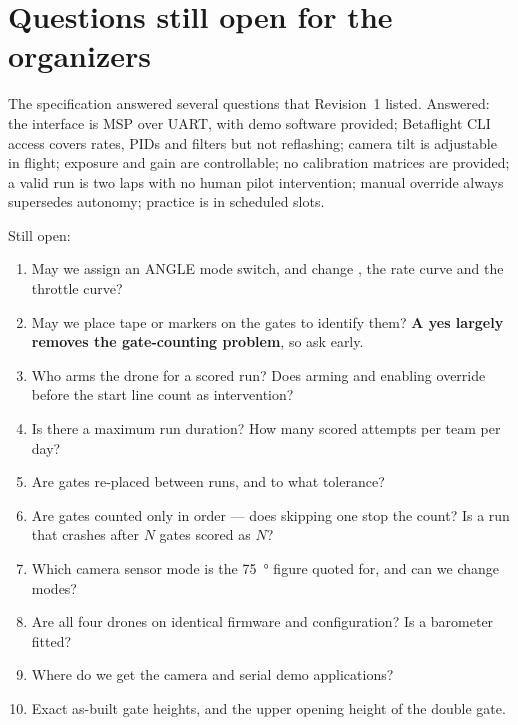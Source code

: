 \section{Questions still open for the organizers}

The specification answered several questions that Revision~1 listed. Answered: the interface is MSP
over UART, with demo software provided; Betaflight CLI access covers rates, PIDs and filters but not
reflashing; camera tilt is adjustable in flight; exposure and gain are controllable; no calibration
matrices are provided; a valid run is two laps with no human pilot intervention; manual override
always supersedes autonomy; practice is in scheduled slots.

Still open:
\begin{enumerate}
\item May we assign an ANGLE mode switch, and change , the rate
curve and the throttle curve?
\item May we place tape or markers on the gates to identify them? \textbf{A yes largely removes the
gate-counting problem}, so ask early.
\item Who arms the drone for a scored run? Does arming and enabling override before the start line
count as intervention?
\item Is there a maximum run duration? How many scored attempts per team per day?
\item Are gates re-placed between runs, and to what tolerance?
\item Are gates counted only in order --- does skipping one stop the count? Is a run that crashes
after $N$ gates scored as $N$?
\item Which camera sensor mode is the \SI{75}{\degree} figure quoted for, and can we change modes?
\item Are all four drones on identical firmware and configuration? Is a barometer fitted?
\item Where do we get the camera and serial demo applications?
\item Exact as-built gate heights, and the upper opening height of the double gate.
\end{enumerate}
